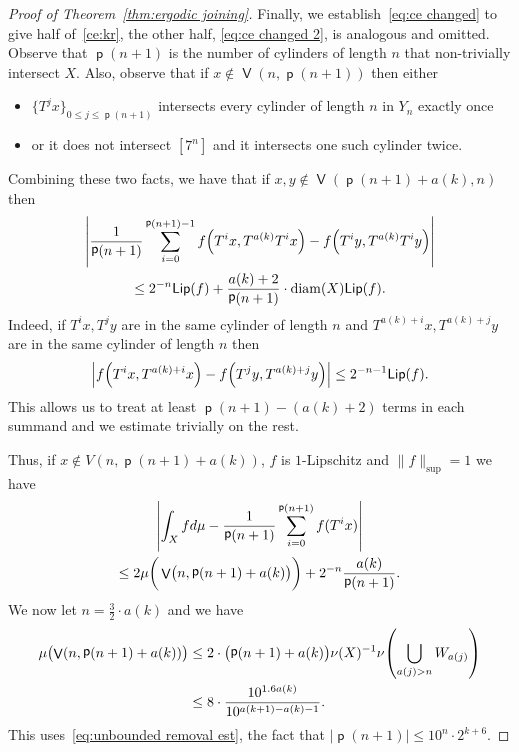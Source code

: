 \documentclass[10pt]{amsart}
\theoremstyle{definition}\newtheorem{defi}[theo]{Definition}\newtheorem{rema}[theo]{Remark}\newtheorem{exam}[theo]{Example}\newtheorem{exem}[theo]{Example}\newtheorem{nota}[theo]{Notation}
\DeclareMathOperator{\bad}{\mathsf{V}}
\DeclareMathOperator{\p}{\mathsf{p}}
\DeclareMathOperator{\diam}{diam}
\newcommand{\Lip}{\mathsf{Lip}}
\let\originalleft\left
\let\originalright\right
\renewcommand{\left}{\mathopen{}\mathclose\bgroup\originalleft}
\renewcommand{\right}{\aftergroup\egroup\originalright}
\begin{document}
\begin{proof}[Proof of Theorem~\ref{thm:ergodic joining}]
Finally, we establish~\eqref{eq:ce changed} to give half of~\eqref{ce:kr}, the other half, \eqref{eq:ce changed 2}, is analogous and omitted. Observe that $\p(n+1)$ is the number of cylinders of length $n$ that non-trivially intersect $X$. Also, observe that if $x \notin \bad(n,\p(n+1))$ then either
\begin{itemize}
\item $\{T^jx\}_{0\leq j \leq \p(n+1)}$ intersects every cylinder of length $n$ in $Y_n$ exactly once
\item or it does not intersect $[7^n]$ and it intersects one such cylinder twice.
\end{itemize}
Combining these two facts, we have that if $x,y \notin \bad(\p(n+1)+a(k),n) $ then
\begin{multline}\label{eq:pair sum close}
\left|\frac{1}{\p(n+1)}\sum_{i=0}^{\p(n+1)-1} f\left(T^ix,T^{a(k)}T^ix\right)-f\left(T^iy,T^{a(k)}T^iy\right) \right|\\
\leq 2^{-n}\Lip(f)+\frac {a(k)+2} {\p(n+1)}\cdot \diam(X) \Lip(f).
\end{multline}
Indeed, if $T^ix,T^jy$ are in the same cylinder of length $n$ and $T^{a(k)+i}x,T^{a(k)+j}y$ are in the same cylinder of length $n$ then
\[
\left|f\left(T^ix,T^{a(k)+i}x\right)-f\left(T^jy,T^{a(k)+j}y\right)\right|\leq 2^{-n-1}\Lip(f).
\]
This allows us to treat at least $\p(n+1)-(a(k)+2)$ terms in each summand and we estimate trivially on the rest.

Thus, if $x \notin V(n,\p(n+1)+a(k))$, $f$ is $1$-Lipschitz and $\|f\|_{\sup}=1$ we have
\begin{multline}\label{eq:for kr}
\left|\int_X f d\mu-\frac 1 {\p(n+1)}\sum_{i=0}^{\p(n+1)}f(T^ix) \right|\\
\leq 2\mu\bigg(\bad\bigl(n,\p(n+1)+a(k)\bigr)\bigg)+2^{-n}\frac {a(k)} {\p(n+1)}.
\end{multline}
We now let $n=\frac 3 2 \cdot a(k)$ and we have
\begin{equation}\label{eq:bad set bound}
\begin{aligned}
\mu\bigl(\bad\left(n,\p(n+1)+a(k)\right)\bigr) &\leq 2 \cdot \bigl(\p(n+1)+a(k)\bigr) \nu(X)^{-1}\nu\left(\bigcup_{a(j)>n}W_{a(j)}\right)\\ 
&\leq 8 \cdot \frac{10^{1.6a(k)}}{10^{a(k+1)-a(k)-1}}.
\end{aligned}
\end{equation}
This uses~\eqref{eq:unbounded removal est}, the fact that $|\p(n+1)|\leq 10^n \cdot 2^{k+6}.$


\end{proof}
\end{document}
